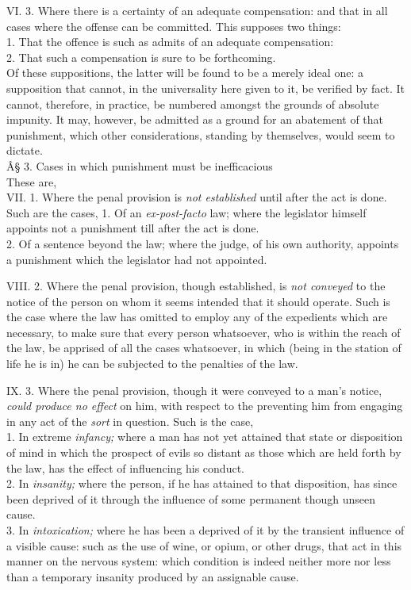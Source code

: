 \documentclass[12pt]{report}
\begin{document}
VI. 3. Where there is a certainty of an adequate compensation: and that
in all cases where the offense can be committed. This supposes two
things:\\
1. That the offence is such as admits of an adequate compensation:\\
2. That such a compensation is sure to be forthcoming.\\
Of these suppositions, the latter will be found to be a merely ideal
one: a supposition that cannot, in the universality here given to it, be
verified by fact. It cannot, therefore, in practice, be numbered amongst
the grounds of absolute impunity. It may, however, be admitted as a
ground for an abatement of that punishment, which other considerations,
standing by themselves, would seem to dictate.\\

Â§ 3. Cases in which punishment must be inefficacious\\
These are,\\
VII. 1. Where the penal provision is \emph{not established} until after
the act is done.\\
Such are the cases, 1. Of an \emph{ex-post-facto} law; where the
legislator himself appoints not a punishment till after the act is
done.\\
2. Of a sentence beyond the law; where the judge, of his own authority,
appoints a punishment which the legislator had not appointed.

VIII. 2. Where the penal provision, though established, is \emph{not
conveyed} to the notice of the person on whom it seems intended that it
should operate. Such is the case where the law has omitted to employ any
of the expedients which are necessary, to make sure that every person
whatsoever, who is within the reach of the law, be apprised of all the
cases whatsoever, in which (being in the station of life he is in) he
can be subjected to the penalties of the law.

IX. 3. Where the penal provision, though it were conveyed to a man's
notice, \emph{could produce no effect} on him, with respect to the
preventing him from engaging in any act of the \emph{sort} in question.
Such is the case,\\
1. In extreme \emph{infancy;} where a man has not yet attained that
state or disposition of mind in which the prospect of evils so distant
as those which are held forth by the law, has the effect of influencing
his conduct.\\
2. In \emph{insanity;} where the person, if he has attained to that
disposition, has since been deprived of it through the influence of some
permanent though unseen cause.\\
3. In \emph{intoxication;} where he has been a deprived of it by the
transient influence of a visible cause: such as the use of wine, or
opium, or other drugs, that act in this manner on the nervous system:
which condition is indeed neither more nor less than a temporary
insanity produced by an assignable cause.
\end{document}
